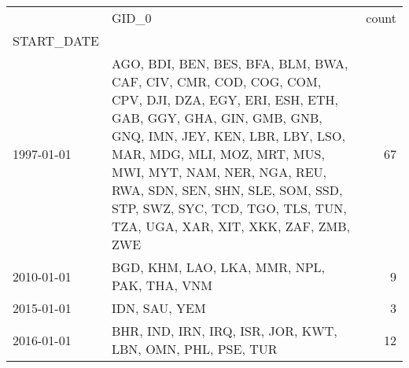 \begin{tabular}{llr}
\toprule
{} &                                                                                                                                                                                                                                                                                                                                                                   GID\_0 &  count \\
START\_DATE &                                                                                                                                                                                                                                                                                                                                                                         &        \\
\midrule
1997-01-01 &                           AGO, BDI, BEN, BES, BFA, BLM, BWA, CAF, CIV, CMR, COD, COG, COM, CPV, DJI, DZA, EGY, ERI, ESH, ETH, GAB, GGY, GHA, GIN, GMB, GNB, GNQ, IMN, JEY, KEN, LBR, LBY, LSO, MAR, MDG, MLI, MOZ, MRT, MUS, MWI, MYT, NAM, NER, NGA, REU, RWA, SDN, SEN, SHN, SLE, SOM, SSD, STP, SWZ, SYC, TCD, TGO, TLS, TUN, TZA, UGA, XAR, XIT, XKK, ZAF, ZMB, ZWE &     67 \\
2010-01-01 &                                                                                                                                                                                                                                                                                                                             BGD, KHM, LAO, LKA, MMR, NPL, PAK, THA, VNM &      9 \\
2015-01-01 &                                                                                                                                                                                                                                                                                                                                                           IDN, SAU, YEM &      3 \\
2016-01-01 &                                                                                                                                                                                                                                                                                                              BHR, IND, IRN, IRQ, ISR, JOR, KWT, LBN, OMN, PHL, PSE, TUR &     12 \\

\end{tabular}
